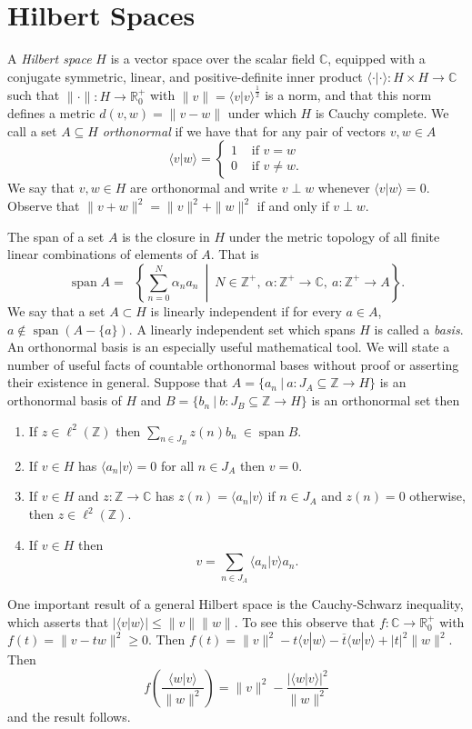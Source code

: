 \documentclass{report}
\newcommand{\Z}{\mathbb{Z}}
\newcommand{\R}{\mathbb{R}}
\newcommand{\C}{\mathbb{C}}
\DeclareMathOperator{\closure}{\ensuremath{clos_d}}
\DeclareMathOperator{\spa}{span}
\begin{document}
\section{Hilbert Spaces}
A \emph{Hilbert space} $H$ is a vector space over the scalar field $\C$, equipped with a conjugate symmetric, linear, and positive-definite inner product $\langle \cdot | \cdot \rangle : H \times H \to \C$ such that $\|\cdot\|: H \to \R^+_0$ with $\|v\|=\langle v | v \rangle^{\frac{1}{2}}$ is a norm, and that this norm defines a metric $d(v,w)=\|v-w\|$ under which $H$ is Cauchy complete. We call a set $A \subseteq H$ \emph{orthonormal} if we have that for any pair of vectors $v, w \in A$
$$
\langle v | w \rangle =
\begin{cases}
	1 & \mbox{ if  } v=w\\
	0 & \mbox{ if } v \neq w.
\end{cases}
$$
We say that $v,w \in H$ are orthonormal and write $v \perp w$ whenever $\langle v | w \rangle=0$. Observe that $\|v+w\|^2=\|v\|^2+\|w\|^2$ if and only if $v \perp w$.

The span of a set $A$ is the closure in $H$ under the metric topology of all finite linear combinations of elements of $A$. That is
$$
\spa A= \closure \left \{\sum_{n=0}^{N}\alpha_n a_n \ \middle |  \ N \in \Z^+, \ \alpha: \Z^+ \to \C, \ a: \Z^+ \to A \right\}.
$$
We say that a set $A \subset H$ is linearly independent if for every $a \in A$, $a \notin \spa (A-\{a\})$.  
A linearly independent set which spans $H$ is called a \emph{basis}. An orthonormal basis is an especially useful mathematical tool. We will state a number of useful facts of countable orthonormal bases without proof or asserting their existence in general. 
Suppose that $A=\{a_n \ | \ a: J_A \subseteq \Z \to H \}$ is an orthonormal basis of $H$ and $B=\{b_n \ | \ b: J_B \subseteq  \Z \to H \}$ is an orthonormal set then
\begin{enumerate}
\item If $z \in \ell^2 (\Z)$ then $\sum_{n\in J_B} z(n)b_n \ \in \spa B$.
\item If $v \in H$ has $\langle a_n | v \rangle=0$ for all $n \in J_A$ then $v=0$.
\item If $v \in H$ and $z: \Z \to \C$ has $z(n)=\langle a_n | v \rangle$ if $n \in J_A$ and $z(n)=0$ otherwise, then $z \in \ell^2 (\Z)$.
\item If $v \in H$ then
$$
v=\sum_{n \in J_A} \langle a_n | v \rangle a_n.
$$
\end{enumerate}
One important result of a general Hilbert space is the Cauchy-Schwarz inequality, which asserts that $| \langle v | w \rangle | \leq \|v\|\|w\|$.
To see this observe that $f: \C \to \R^+_0$ with $f(t)=\|v-tw\|^2 \geq 0$.
 Then $f(t)=\|v\|^2-t\langle v|w \rangle- \overline t \langle w|v \rangle+|t|^2\|w\|^2$. 
 Then $$f\left( \frac{\langle w|v\rangle}{\|w\|^2} \right)=\|v\|^2-\frac{|\langle w|v \rangle|^2}{\|w\|^2}$$ and the result follows.
 
\end{document}
